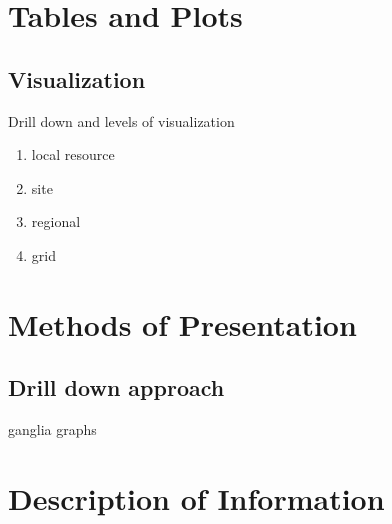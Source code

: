 \section{Tables and Plots}
\subsection{Visualization}
Drill down and levels of visualization
\begin{enumerate}
  \item local resource
  \item site
  \item regional
  \item grid
\end{enumerate}
\section{Methods of Presentation}
\subsection{Drill down approach}
ganglia graphs
\section{Description of Information}